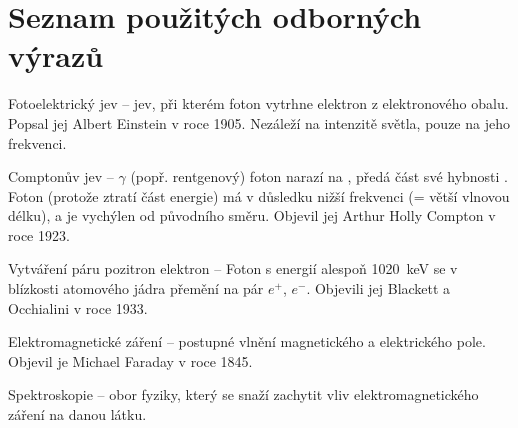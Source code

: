 \section*{Seznam použitých odborných výrazů}
\begin{list}{}{}
	\item [Fotoelektrický jev] -- jev, při kterém foton vytrhne elektron z elektronového obalu. Popsal jej Albert Einstein v roce 1905. Nezáleží na intenzitě světla, pouze na jeho frekvenci. 
	\item [Comptonův jev] -- $\gamma$ (popř. rentgenový) foton narazí na \e, předá část své hybnosti \e. Foton (protože ztratí část energie) má v důsledku nižší frekvenci (= větší vlnovou délku), a je vychýlen od původního směru. Objevil jej  Arthur Holly Compton v roce 1923.
	\item [Vytváření páru pozitron elektron] -- Foton s energií alespoň \SI{1020}{\kilo\electronvolt} se v blízkosti atomového jádra přemění na pár $e^{+}$, $e^{-}$. Objevili jej Blackett a Occhialini v roce 1933.
	\item [Elektromagnetické záření] -- postupné vlnění magnetického a elektrického pole. Objevil je Michael Faraday v roce 1845. 
	\item [Spektroskopie] -- obor fyziky, který se snaží zachytit vliv elektromagnetického záření na danou látku.
\end{list}
\newpage

